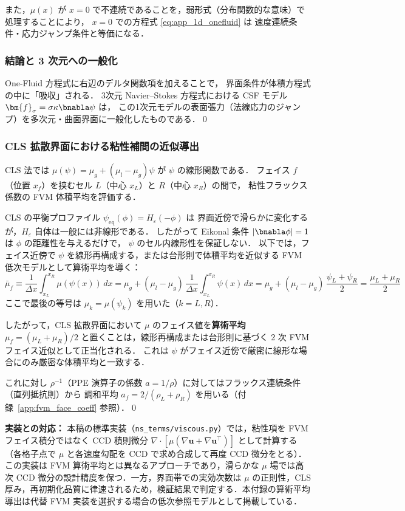 また，$\mu(x)$ が $x = 0$ で不連続であることを，弱形式（分布関数的な意味）で処理することにより，
$x=0$ での方程式 \eqref{eq:app_1d_onefluid} は
速度連続条件・応力ジャンプ条件と等価になる．

\subsubsection*{結論と 3 次元への一般化}

One-Fluid 方程式に右辺のデルタ関数項を加えることで，
界面条件が体積方程式の中に「吸収」される．
3次元 Navier--Stokes 方程式における CSF モデル $\bm{f}_\sigma = \sigma\kappa\bnabla\psi$ は，
この1次元モデルの表面張力（法線応力のジャンプ）を多次元・曲面界面に一般化したものである．\qed

\subsubsection*{CLS 拡散界面における粘性補間の近似導出}
\label{app:mu_interp_derivation}

CLS 法では $\mu(\psi) = \mu_g + (\mu_l - \mu_g)\psi$ が $\psi$ の線形関数である．
フェイス $f$（位置 $x_f$）を挟むセル $L$（中心 $x_L$）と $R$（中心 $x_R$）の間で，
粘性フラックス係数の FVM 体積平均を評価する．

CLS の平衡プロファイル $\psi_{\mathrm{eq}}(\phi) = H_\varepsilon(-\phi)$ は
界面近傍で滑らかに変化するが，$H_\varepsilon$ 自体は一般には非線形である．
したがって Eikonal 条件 $|\bnabla\phi|=1$ は $\phi$ の距離性を与えるだけで，
$\psi$ のセル内線形性を保証しない．
以下では，フェイス近傍で $\psi$ を線形再構成する，または台形則で体積平均を近似する
FVM 低次モデルとして算術平均を導く：
\[
  \bar{\mu}_f
  \equiv \frac{1}{\Delta x}\int_{x_L}^{x_R} \mu(\psi(x))\,dx
  = \mu_g + (\mu_l-\mu_g)\,\frac{1}{\Delta x}\int_{x_L}^{x_R}\psi(x)\,dx
  = \mu_g + (\mu_l-\mu_g)\,\frac{\psi_L+\psi_R}{2}
  = \frac{\mu_L+\mu_R}{2}
\]
ここで最後の等号は $\mu_k = \mu(\psi_k)$ を用いた（$k=L,R$）．

したがって，CLS 拡散界面において $\mu$ のフェイス値を\textbf{算術平均}
$\mu_f = (\mu_L+\mu_R)/2$ と置くことは，線形再構成または台形則に基づく
2 次 FVM フェイス近似として正当化される．
これは $\psi$ がフェイス近傍で厳密に線形な場合にのみ厳密な体積平均と一致する．

これに対し $\rho^{-1}$（PPE 演算子の係数 $a = 1/\rho$）に対してはフラックス連続条件（直列抵抗則）から
調和平均 $a_f = 2/(\rho_L+\rho_R)$ を用いる（付録~\ref{app:fvm_face_coeff} 参照）．\qed

\noindent\textbf{実装との対応：} 本稿の標準実装（\texttt{ns\_terms/viscous.py}）では，粘性項を FVM フェイス積分ではなく CCD 積則微分 $\nabla\cdot[\mu(\nabla\bm{u}+\nabla\bm{u}^\top)]$ として計算する（各格子点で $\mu$ と各速度勾配を CCD で求め合成して再度 CCD 微分をとる）．この実装は FVM 算術平均とは異なるアプローチであり，滑らかな $\mu$ 場では高次 CCD 微分の設計精度を保つ．一方，界面帯での実効次数は $\mu$ の正則性，CLS 厚み，再初期化品質に律速されるため，検証結果で判定する．本付録の算術平均導出は代替 FVM 実装を選択する場合の低次参照モデルとして掲載している．

